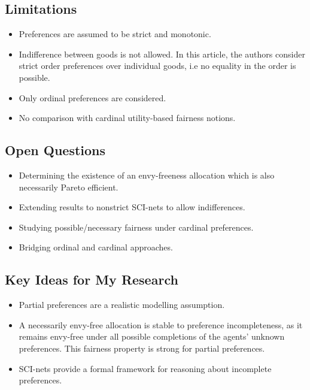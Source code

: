 \documentclass[12pt,a4paper]{article}
\begin{document}
\subsection*{Limitations}
\begin{itemize}
    \item Preferences are assumed to be strict and monotonic.
    \item Indifference between goods is not allowed. In this article, the authors consider strict order preferences over individual goods, i.e no equality in the order is possible.
    \item Only ordinal preferences are considered.
    \item No comparison with cardinal utility-based fairness notions.
\end{itemize}

\subsection*{Open Questions}
\begin{itemize}
    \item Determining the existence of an envy-freeness allocation which is also necessarily Pareto efficient.
    \item Extending results to nonstrict SCI-nets to allow indifferences.
    \item Studying possible/necessary fairness under cardinal preferences.
    \item Bridging ordinal and cardinal approaches.
\end{itemize}

\subsection*{Key Ideas for My Research}
\label{subsec:relevance1}
\begin{itemize}
    \item Partial preferences are a realistic modelling assumption.
    \item A necessarily envy-free allocation is stable to preference incompleteness, as it remains envy-free under all possible completions of the agents' unknown preferences. This fairness property is strong for partial preferences.
    \item SCI-nets provide a formal framework for reasoning about incomplete preferences.
\end{itemize}
\end{document}

